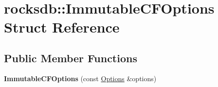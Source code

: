 \hypertarget{structrocksdb_1_1ImmutableCFOptions}{}\section{rocksdb\+:\+:Immutable\+C\+F\+Options Struct Reference}
\label{structrocksdb_1_1ImmutableCFOptions}
\subsection*{Public Member Functions}
\begin{DoxyCompactItemize}
\item 
{\bfseries Immutable\+C\+F\+Options} (const \hyperlink{structrocksdb_1_1Options}{Options} \&options)\hypertarget{structrocksdb_1_1ImmutableCFOptions_a7254f2e3a94d5a2267652fb7c34d12f0}{}\label{structrocksdb_1_1ImmutableCFOptions_a7254f2e3a94d5a2267652fb7c34d12f0}

\end{DoxyCompactItemize}

